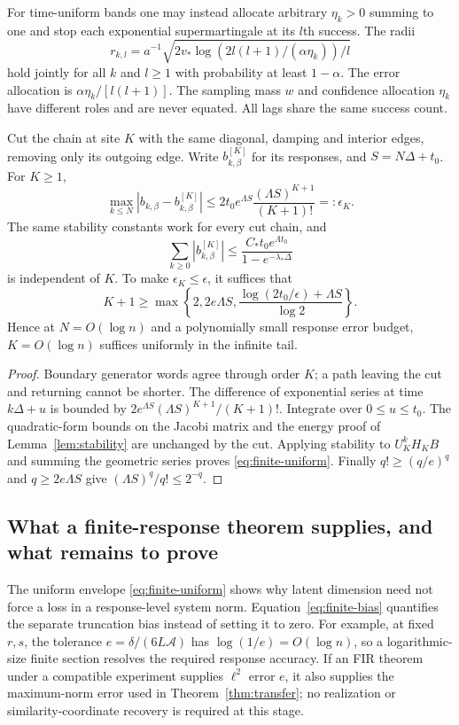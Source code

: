 For time-uniform bands one may instead allocate arbitrary $\eta_k>0$ summing
to one and stop each exponential supermartingale at its $l$th success. The
radii
\[
 r_{k,l}=a^{-1}\sqrt{2v_*\log(2l(l+1)/(\alpha\eta_k))/l}
\]
hold jointly for all $k$ and $l\ge1$ with probability at least $1-\alpha$.
The error allocation is $\alpha\eta_k/[l(l+1)]$. The sampling mass $w$ and
confidence allocation $\eta_k$ have different roles and are never equated.
All lags share the same success count.

\begin{proposition}
\label{prop:finite-section}
Cut the chain at site $K$ with the same diagonal, damping and interior edges,
removing only its outgoing edge. Write $b^{[K]}_{k,\beta}$ for its responses,
and $S=N\Delta+t_0$. For $K\ge1$,
\begin{equation}
 \max_{k\le N}|b_{k,\beta}-b^{[K]}_{k,\beta}|
 \le 2t_0 e^{\Lambda S}\frac{(\Lambda S)^{K+1}}{(K+1)!}
 =:\epsilon_K.\label{eq:finite-bias}
\end{equation}
The same stability constants work for every cut chain, and
\begin{equation}
 \sum_{k\ge0}|b^{[K]}_{k,\beta}|
 \le\frac{C_*t_0e^{\Lambda t_0}}{1-e^{-\lambda_*\Delta}}
 \label{eq:finite-uniform}
\end{equation}
is independent of $K$. To make $\epsilon_K\le\epsilon$, it suffices that
\[
 K+1\ge\max\left\{2,2e\Lambda S,
  \frac{\log(2t_0/\epsilon)+\Lambda S}{\log2}\right\}.
\]
Hence at $N=O(\log n)$ and a polynomially small response error budget,
$K=O(\log n)$ suffices uniformly in the infinite tail.
\end{proposition}
\begin{proof}
Boundary generator words agree through order $K$; a path leaving the cut and
returning cannot be shorter. The difference of exponential series at time
$k\Delta+u$ is bounded by
$2e^{\Lambda S}(\Lambda S)^{K+1}/(K+1)!$. Integrate over $0\le u\le t_0$.
The quadratic-form bounds on the Jacobi matrix and the energy proof of
Lemma~\ref{lem:stability} are unchanged by the cut. Applying stability to
$U_K^kH_KB$ and summing the geometric series proves
\eqref{eq:finite-uniform}. Finally $q!\ge(q/e)^q$ and $q\ge2e\Lambda S$
give $(\Lambda S)^q/q!\le2^{-q}$.
\end{proof}

\subsection{What a finite-response theorem supplies, and what remains to prove}
The uniform envelope \eqref{eq:finite-uniform} shows why latent dimension need
not force a loss in a response-level system norm. Equation~\eqref{eq:finite-bias}
quantifies the separate truncation bias instead of setting it to zero.
For example, at fixed $r,s$, the tolerance
$e=\delta/(6L\mathcal A)$ has $\log(1/e)=O(\log n)$, so a logarithmic-size
finite section resolves the required response accuracy. If an FIR theorem
under a compatible experiment supplies $\ell^2$ error $e$, it also supplies
the maximum-norm error used in Theorem~\ref{thm:transfer}; no realization or
similarity-coordinate recovery is required at this stage.


